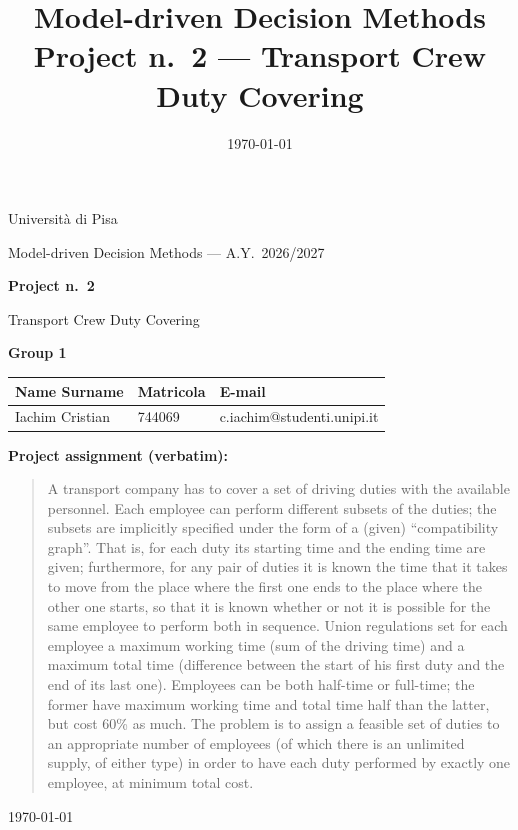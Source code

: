 \documentclass[11pt,a4paper]{article}
\title{Model-driven Decision Methods\\[0.3em]
       \large Project n.~2 --- Transport Crew Duty Covering}
\author{}
\date{\today}
\theoremstyle{remark}
\begin{document}
\begin{titlepage}
  \centering
  {\Large Università di Pisa\par}
  \vspace{0.5em}
  {\large Model-driven Decision Methods --- A.Y.~2026/2027\par}
  \vspace{3em}
  {\LARGE\bfseries Project n.~2\par}
  \vspace{0.5em}
  {\Large Transport Crew Duty Covering\par}
  \vspace{3em}

  {\large \textbf{Group 1}\par}
  \vspace{1em}
  \begin{tabular}{lll}
    \toprule
    \textbf{Name Surname} & \textbf{Matricola} & \textbf{E-mail} \\
    \midrule
    Iachim Cristian & 744069 & c.iachim@studenti.unipi.it \\
    \bottomrule
  \end{tabular}

  \vspace{3em}
  \begin{flushleft}
  \textbf{Project assignment (verbatim):}
  \end{flushleft}
  \begin{quote}
  \small
  A transport company has to cover a set of driving duties with the available
  personnel. Each employee can perform different subsets of the duties; the
  subsets are implicitly specified under the form of a (given) ``compatibility
  graph''. That is, for each duty its starting time and the ending time are
  given; furthermore, for any pair of duties it is known the time that it takes
  to move from the place where the first one ends to the place where the other
  one starts, so that it is known whether or not it is possible for the same
  employee to perform both in sequence. Union regulations set for each employee
  a maximum working time (sum of the driving time) and a maximum total time
  (difference between the start of his first duty and the end of its last one).
  Employees can be both half-time or full-time; the former have maximum working
  time and total time half than the latter, but cost 60\% as much. The problem
  is to assign a feasible set of duties to an appropriate number of employees
  (of which there is an unlimited supply, of either type) in order to have each
  duty performed by exactly one employee, at minimum total cost.
  \end{quote}

  \vfill
  {\small \today\par}
\end{titlepage}
\end{document}
